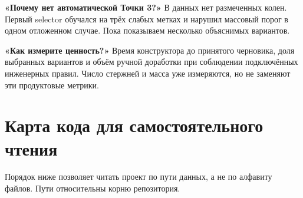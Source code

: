 \documentclass[11pt,a4paper]{article}
\begin{document}
\textbf{«Почему нет автоматической Точки 3?»} В данных нет размеченных колен. Первый selector обучался на трёх слабых метках и нарушил массовый порог в одном отложенном случае. Пока показываем несколько объяснимых вариантов.


\textbf{«Как измерите ценность?»} Время конструктора до принятого черновика, доля выбранных вариантов и объём ручной доработки при соблюдении подключённых инженерных правил. Число стержней и масса уже измеряются, но не заменяют эти продуктовые метрики.


\section{Карта кода для самостоятельного чтения}

Порядок ниже позволяет читать проект по пути данных, а не по алфавиту файлов. Пути относительны корню репозитория.
\end{document}
